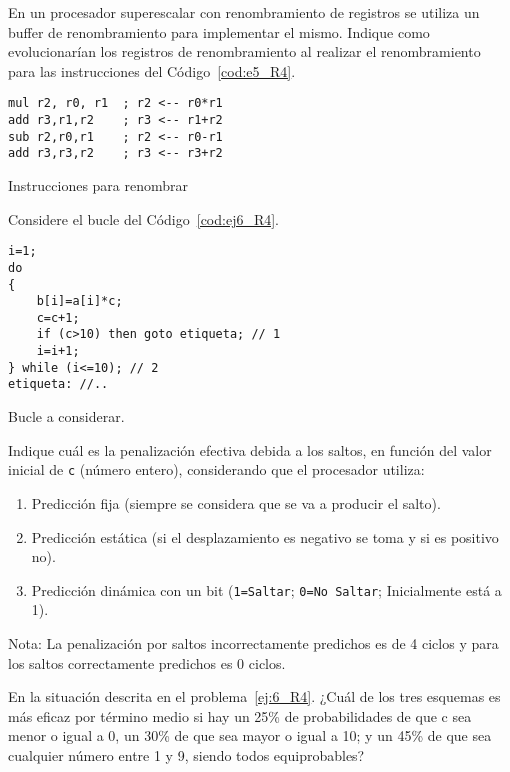 \begin{ejercicio}
    En un procesador superescalar con renombramiento de registros se utiliza un buffer de renombramiento para implementar el mismo. Indique como evolucionarían los registros de renombramiento al realizar el renombramiento para las instrucciones del Código~\ref{cod:e5_R4}.
   \begin{listing}[H]
   \begin{verbatim}
mul r2, r0, r1  ; r2 <-- r0*r1
add r3,r1,r2    ; r3 <-- r1+r2
sub r2,r0,r1    ; r2 <-- r0-r1
add r3,r3,r2    ; r3 <-- r3+r2
   \end{verbatim}
   \caption{Instrucciones para renombrar}
   \label{cod:e5_R4}
   \end{listing}
\end{ejercicio}

\begin{ejercicio}\label{ej:6_R4}
    Considere el bucle del Código~\ref{cod:ej6_R4}.
    \begin{listing}[H]
    \begin{verbatim}
i=1;
do
{
    b[i]=a[i]*c;
    c=c+1;
    if (c>10) then goto etiqueta; // 1
    i=i+1;
} while (i<=10); // 2
etiqueta: //..
    \end{verbatim}
    \caption{Bucle a considerar.}
    \label{cod:ej6_R4}
    \end{listing}

Indique cuál es la penalización efectiva debida a los saltos, en función del valor inicial de \verb|c| (número entero), considerando que el procesador utiliza:
\begin{enumerate}
    \item Predicción fija (siempre se considera que se va a producir el salto).
    \item Predicción estática (si el desplazamiento es negativo se toma y si es positivo no).
    \item Predicción dinámica con un bit (\verb|1=Saltar|; \verb|0=No Saltar|; Inicialmente está a 1).
\end{enumerate}
Nota: La penalización por saltos incorrectamente predichos es de 4 ciclos y para los saltos correctamente predichos es 0 ciclos.
\end{ejercicio}

\begin{ejercicio}
    En la situación descrita en el problema~\ref{ej:6_R4}. ¿Cuál de los tres esquemas es más eficaz por término medio si hay un 25\% de probabilidades de que c sea menor o igual a 0, un 30\% de que sea mayor o igual a 10; y un 45\% de que sea cualquier número entre 1 y 9, siendo todos equiprobables? 
\end{ejercicio}

